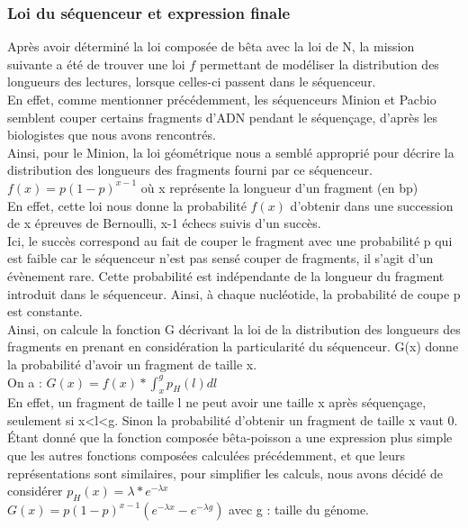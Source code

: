 \documentclass[11pt,a4paper]{article} %
\begin{document}
\subsubsection{Loi du séquenceur et expression finale}
Après avoir déterminé la loi composée de bêta avec la loi de N, la mission suivante a été de trouver une loi $f$ permettant de modéliser la distribution des longueurs des lectures, lorsque celles-ci passent dans le séquenceur. \\
En effet, comme mentionner précédemment, les séquenceurs Minion et Pacbio semblent couper certains fragments d'ADN pendant le séquençage, d'après les biologistes que nous avons rencontrés.\\
Ainsi, pour le Minion, la loi géométrique nous a semblé approprié pour décrire la distribution des longueurs des fragments fourni par ce séquenceur. \\
$f(x) = p(1-p)^{x-1}$ où x représente la longueur d'un fragment (en bp) \\
En effet, cette loi nous donne la probabilité $f(x)$ d'obtenir dans une succession de x épreuves de Bernoulli, x-1 échecs suivis d'un succès.\\
Ici, le succès correspond au fait de couper le fragment avec une probabilité p qui est faible car le séquenceur n'est pas sensé couper de fragments, il s'agit d'un évènement rare.
Cette probabilité est indépendante de la longueur du fragment introduit dans le séquenceur. Ainsi, à chaque nucléotide, la probabilité de coupe p est constante.  \\
Ainsi, on calcule la fonction G décrivant la loi de la distribution des longueurs des fragments en prenant en considération la particularité du séquenceur. G(x) donne la probabilité d'avoir un fragment de taille x.\\

On a : $G(x)=f(x)*\int_{x}^{g}p_H(l)dl$ \\

En effet, un fragment de taille l ne peut avoir une taille x après séquençage, seulement si x<l<g. Sinon la probabilité d'obtenir un fragment de taille x vaut 0. \\
Étant donné que la fonction composée bêta-poisson a une expression plus simple que les autres fonctions composées calculées précédemment, et que leurs représentations sont similaires, pour simplifier les calculs, nous avons décidé de considérer $p_H(x) = \lambda*e^{-\lambda x}$ \\

$G(x)=p(1-p)^{x-1}( e^{-\lambda x}- e^{-\lambda g})$ avec g : taille du génome.\\
\end{document}

